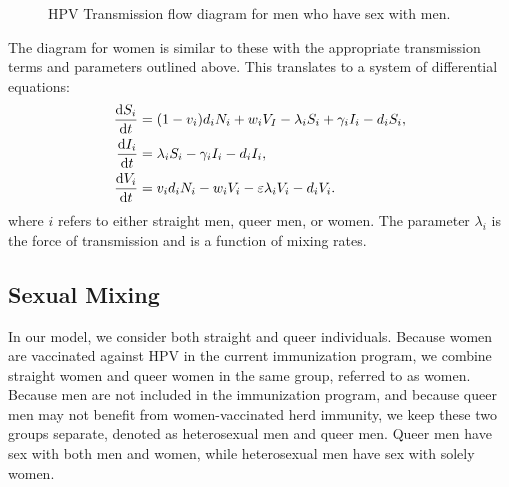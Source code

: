 \documentclass[12pt]{article}
\begin{document}
%
\begin{figure}[h!]
\begin{center}
\end{center}
\caption{HPV Transmission flow diagram for men who have sex with men.}
\label{fig:flowQueer}
\end{figure}
The diagram for women is similar to these with the appropriate transmission terms and parameters outlined above. This translates to a system of differential equations:
\begin{align}
\frac{\mathrm{d}S_i}{\mathrm{d}t}&=(1-v_i)d_iN_i + w_iV_I - \lambda_iS_i + \gamma_iI_i - d_iS_i,\\
\frac{\mathrm{d}I_i}{\mathrm{d}t}&= \lambda_iS_i - \gamma_iI_i- d_iI_i,\\
\frac{\mathrm{d}V_i}{\mathrm{d}t}&= v_id_iN_i - w_iV_i - \varepsilon \lambda_iV_i - d_iV_i.
\end{align}
where $i$ refers to either straight men, queer men, or women.  The parameter $\lambda_i$ is the force of transmission and is a function of mixing rates.  

\subsection*{Sexual Mixing}

In our model, we consider both straight and queer individuals.  Because women are vaccinated against HPV in the current immunization program, we combine straight women and queer women in the same group, referred to as women.  Because men are not included in the immunization program, and because queer men may not benefit from women-vaccinated herd immunity, we keep these two groups separate, denoted as heterosexual men and queer men.  Queer men have sex with both men and women, while heterosexual men have sex with solely women.  
\end{document}
